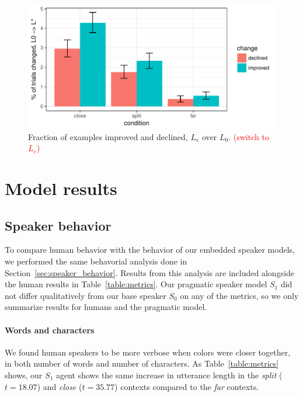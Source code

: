 \documentclass[11pt,letterpaper]{article}
\newcommand{\Listener}{L}
\newcommand{\Speaker}{S}
\renewcommand{\|}{\mid}
\newcommand{\secref}[1]{Section~\ref{#1}}
\newcommand{\Tabref}[1]{Table~\ref{#1}}
\newcommand{\tabref}[1]{Table~\ref{#1}}
\newcommand{\todocheck}[1]{\textcolor{red}{#1}}
\newcommand{\cond}{\emph}
\begin{document}
\begin{figure}
\centering
\includegraphics[scale = .45]{figures/changedByCondition.pdf}
\caption{Fraction of examples improved and declined, $\Listener_e$ over $\Listener_0$. \todocheck{(switch to $\Listener_e$)}}
\label{fig:changedByCondition}
\end{figure}

\section{Model results}

\subsection{Speaker behavior}

To compare human behavior with the behavior of our embedded speaker models,
we performed the same behavorial analysis done in \secref{sec:speaker_behavior}.
Results from this analysis are included alongside the human results in
\Tabref{table:metrics}.
Our pragmatic speaker model $\Speaker_1$ did not differ
qualitatively from our base speaker $\Speaker_0$ on any of the metrics,
so we only summarize results for humans and the pragmatic model.

\paragraph{Words and characters} We found human speakers to be more verbose when
colors were closer together, in both number of words and number of characters.
As \tabref{table:metrics} shows, our $\Speaker_{1}$  agent
shows the same increase in utterance length in the \cond{split} ($t = 18.07$) and \cond{close} ($t = 35.77$) contexts compared to the \cond{far} contexts.
\end{document}
